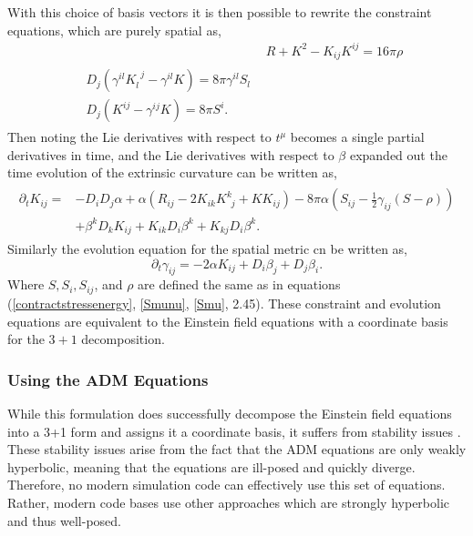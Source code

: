 \documentclass[11pt]{article}
\newcommand{\blank}{\enspace}
\numberwithin{equation}{section}
\begin{document}
With this choice of basis vectors it is then possible to rewrite the constraint equations, which are purely spatial as,
\begin{align}\label{ADMconstraint}
&R + K^2 - K_{ij}K^{ij} = 16\pi \rho \\ 
\begin{split}
&D_{j}(\gamma^{il}K_{l}^{\blank j} - \gamma^{il}K) = 8\pi \gamma^{il}S_{l} \\
&D_j(K^{ij} - \gamma^{ij}K) = 8\pi S^i.
\end{split}
\end{align}
Then noting the Lie derivatives with respect to $t^{\mu}$ becomes a single partial derivatives in time, and the Lie derivatives with respect to $\beta$ expanded out the time evolution of the extrinsic curvature can be written as,
\begin{align}\label{ADMevolution}
\begin{split}
    \partial_t K_{ij} = &-D_{i}D_{j}\alpha + \alpha(R_{ij} - 2K_{ik}K^{k}_{\blank j} + KK_{ij}) - 8\pi\alpha(S_{ij} - \frac12\gamma_{ij}(S - \rho)) \\ 
&+ \beta^kD_kK_{ij} + K_{ik}D_i\beta^k + K_{kj}D_i\beta^k.
\end{split}
\end{align}
Similarly the evolution equation for the spatial metric cn be written as,
\begin{equation}
    \partial_t \gamma_{ij} = - 2\alpha K_{ij} + D_i\beta_j + D_j\beta_i.  
\end{equation}
Where $S, S_i, S_{ij}$, and $\rho$ are defined the same as in equations (\ref{contractstressenergy}, \ref{Smunu}, \ref{Smu}, 2.45). These constraint and evolution equations are equivalent to the Einstein field equations with a coordinate basis for the $3+1$ decomposition. 

\subsubsection{Using the ADM Equations}
While this formulation does successfully decompose the Einstein field equations into a 3+1 form and assigns it a coordinate basis, it suffers from stability issues \cite{baumgarte_shapiro_2010, 2002gr.qc.....9111S}. These stability issues arise from the fact that the ADM equations are only weakly hyperbolic, meaning that the equations are ill-posed \cite{kreiss_lorenz_2004} and quickly diverge. Therefore, no modern simulation code can effectively use this set of equations. Rather, modern code bases use other approaches which are strongly hyperbolic and thus well-posed.
\end{document}
